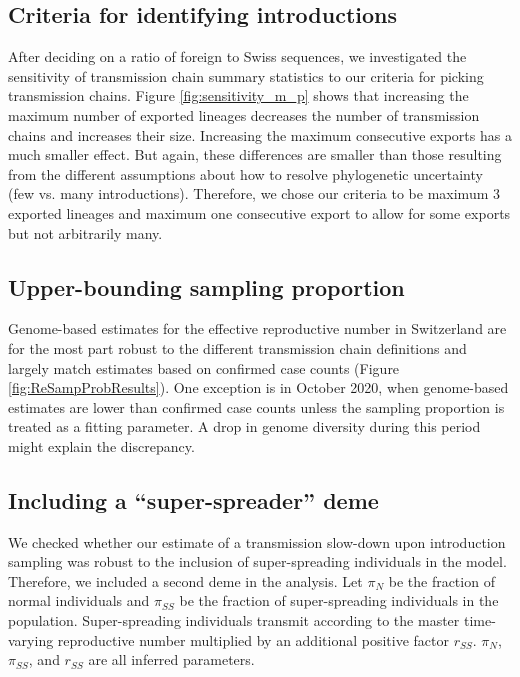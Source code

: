\documentclass[9pt,twoside,lineno]{pnas-new}
\begin{document}
\subsection{Criteria for identifying introductions}
After deciding on a ratio of foreign to Swiss sequences, we investigated the sensitivity of transmission chain summary statistics to our criteria for picking transmission chains. Figure \ref{fig:sensitivity_m_p} shows that increasing the maximum number of exported lineages decreases the number of transmission chains and increases their size. Increasing the maximum consecutive exports has a much smaller effect. But again, these differences are smaller than those resulting from the different assumptions about how to resolve phylogenetic uncertainty (few vs. many introductions). Therefore, we chose our criteria to be maximum 3 exported lineages and maximum one consecutive export to allow for some exports but not arbitrarily many. 

\subsection{Upper-bounding sampling proportion}
Genome-based estimates for the effective reproductive number in Switzerland are for the most part robust to the different transmission chain definitions and largely match estimates based on confirmed case counts (Figure \ref{fig:ReSampProbResults}). One exception is in October 2020, when genome-based estimates are lower than confirmed case counts unless the sampling proportion is treated as a fitting parameter. A drop in genome diversity during this period might explain the discrepancy. 

\subsection{Including a ``super-spreader'' deme}
We checked whether our estimate of a transmission slow-down upon introduction sampling was robust to the inclusion of super-spreading individuals in the model. Therefore, we included a second deme in the analysis. Let $\pi_N$ be the fraction of normal individuals and $\pi_{SS}$ be the fraction of super-spreading individuals in the population. Super-spreading individuals transmit according to the master time-varying reproductive number multiplied by an additional positive factor $r_{SS}$. $\pi_N$, $\pi_{SS}$, and $r_{SS}$ are all inferred parameters. 
\end{document}
